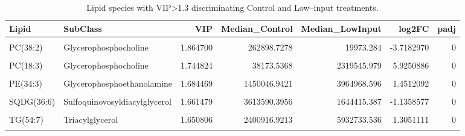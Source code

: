\begin{table}[!h]
\centering
\caption{Lipid species with VIP>1.3 discriminating Control and Low–input treatments.}
\centering
\begin{tabular}[t]{llrrrrr}
\toprule
Lipid & SubClass & VIP & Median\_Control & Median\_LowInput & log2FC & padj\\
\midrule
\cellcolor{gray!10}{DG(20:1)} & \cellcolor{gray!10}{Diacylglycerol} & \cellcolor{gray!10}{1.970716} & \cellcolor{gray!10}{240794.5279} & \cellcolor{gray!10}{3959422.111} & \cellcolor{gray!10}{4.0394097} & \cellcolor{gray!10}{0}\\
PC(38:2) & Glycerophosphocholine & 1.864700 & 262898.7278 & 19973.284 & -3.7182970 & 0\\
\cellcolor{gray!10}{TG(56:6)} & \cellcolor{gray!10}{Triacylglycerol} & \cellcolor{gray!10}{1.825276} & \cellcolor{gray!10}{17711.4251} & \cellcolor{gray!10}{152028.860} & \cellcolor{gray!10}{3.1015210} & \cellcolor{gray!10}{0}\\
PC(18:3) & Glycerophosphocholine & 1.744824 & 38173.5368 & 2319545.979 & 5.9250886 & 0\\
\cellcolor{gray!10}{TG(54:5)} & \cellcolor{gray!10}{Triacylglycerol} & \cellcolor{gray!10}{1.703732} & \cellcolor{gray!10}{266013.4219} & \cellcolor{gray!10}{1852360.801} & \cellcolor{gray!10}{2.7997895} & \cellcolor{gray!10}{0}\\
\addlinespace
PE(34:3) & Glycerophosphoethanolamine & 1.684469 & 1450046.9421 & 3964968.596 & 1.4512092 & 0\\
\cellcolor{gray!10}{PC(32:3)} & \cellcolor{gray!10}{Glycerophosphocholine} & \cellcolor{gray!10}{1.683786} & \cellcolor{gray!10}{26024.5487} & \cellcolor{gray!10}{180405.049} & \cellcolor{gray!10}{2.7932472} & \cellcolor{gray!10}{0}\\
SQDG(36:6) & Sulfoquinovosyldiacylglycerol & 1.661479 & 3613590.3956 & 1644415.387 & -1.1358577 & 0\\
\cellcolor{gray!10}{DG(34:3)} & \cellcolor{gray!10}{Diacylglycerol} & \cellcolor{gray!10}{1.654583} & \cellcolor{gray!10}{1341708.8094} & \cellcolor{gray!10}{3219225.743} & \cellcolor{gray!10}{1.2626415} & \cellcolor{gray!10}{0}\\
TG(54:7) & Triacylglycerol & 1.650806 & 2400916.9213 & 5932733.536 & 1.3051111 & 0\\
\addlinespace
\cellcolor{gray!10}{SQDG(34:3)} & \cellcolor{gray!10}{Sulfoquinovosyldiacylglycerol} & \cellcolor{gray!10}{1.610140} & \cellcolor{gray!10}{6656482.4748} & \cellcolor{gray!10}{3520983.341} & \cellcolor{gray!10}{-0.9187814} & \cellcolor{gray!10}{0}\\

\end{tabular}
\end{table}
